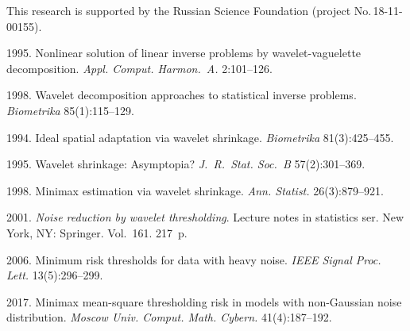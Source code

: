 





  \Ack
\noindent
This research is supported by the Russian Science Foundation (project No.\,18-11-00155).



  \begin{multicols}{2}

\renewcommand{\bibname}{\protect\rmfamily References}

{\small\frenchspacing
 {%
 \begin{thebibliography}{99}

 1995. Nonlinear solution of linear inverse problems 
by wavelet-vaguelette decomposition. \textit{Appl. Comput. Harmon.~A.} 2:101--126.

 1998. Wavelet decomposition approaches to statistical inverse problems.
 \textit{Biometrika} 85(1):115--129.

 1994. Ideal spatial adaptation via wavelet shrinkage. \textit{Biometrika} 81(3):425--455.

 1995. Wavelet shrinkage: Asymptopia? \textit{J.~R.~Stat. Soc.~B}
 57(2):301--369.

 1998. Minimax estimation via wavelet shrinkage. \textit{Ann. Statist.} 26(3):879--921.

 2001. \textit{Noise reduction by wavelet thresholding}. 
 Lecture notes in statistics ser.
 New York, NY: Springer. Vol.~161. 217~p.

 2006. Minimum risk thresholds for data with heavy noise. 
\textit{IEEE Signal Proc. Lett.} 13(5):296--299.

 2017. Minimax mean-square thresholding risk 
in models with non-Gaussian noise distribution. 
\textit{Moscow Univ. Comput. Math. Cybern.} 41(4):187--192.


\end{thebibliography}}}
\end{multicols}
